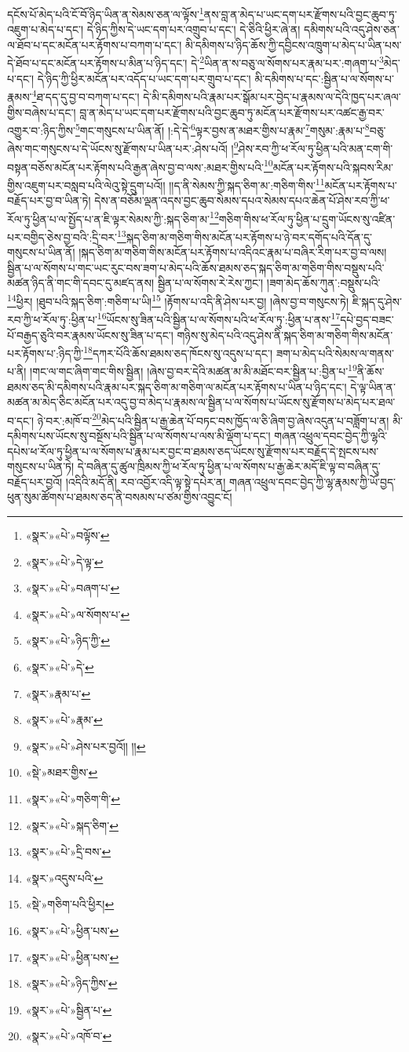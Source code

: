 དངོས་པོ་མེད་པའི་ངོ་བོ་ཉིད་ཡིན་ན་སེམས་ཅན་ལ་ལྟོས་\footnote{«སྣར་»«པེ་»བལྟོས་}ནས་བླ་ན་མེད་པ་ཡང་དག་པར་རྫོགས་པའི་བྱང་ཆུབ་ཏུ་འཇུག་པ་མེད་པ་དང་། དེ་ཉིད་ཀྱིས་དེ་ཡང་དག་པར་འགྲུབ་པ་དང་། དེ་ཅིའི་ཕྱིར་ཞེ་ན། དམིགས་པའི་འདུ་ཤེས་ཅན་ལ་ཐོབ་པ་དང་མངོན་པར་རྟོགས་པ་བཀག་པ་དང་། མི་དམིགས་པ་ཉིད་ཆོས་ཀྱི་དབྱིངས་འཁྲུག་པ་མེད་པ་ཡིན་པས་དེ་ཐོབ་པ་དང་མངོན་པར་རྟོགས་པ་མིན་པ་ཉིད་དང་། དེ་\footnote{«སྣར་»«པེ་»དེ་ལྟ་}ཡིན་ན་ས་བཅུ་ལ་སོགས་པར་རྣམ་པར་:གཞག་པ་\footnote{«སྣར་»«པེ་»བཞག་པ་}མེད་པ་དང་། དེ་ཉིད་ཀྱི་ཕྱིར་མངོན་པར་འདོད་པ་ཡང་དག་པར་གྲུབ་པ་དང་། མི་དམིགས་པ་དང་:སྦྱིན་པ་ལ་སོགས་པ་རྣམས་\footnote{«སྣར་»«པེ་»ལ་སོགས་པ་}ཐ་དད་དུ་བྱ་བ་བཀག་པ་དང་། དེ་མི་དམིགས་པའི་རྣམ་པར་སྒོམ་པར་བྱེད་པ་རྣམས་ལ་དེའི་ཁྱད་པར་ཞལ་གྱིས་བཞེས་པ་དང་། བླ་ན་མེད་པ་ཡང་དག་པར་རྫོགས་པའི་བྱང་ཆུབ་ཏུ་མངོན་པར་རྫོགས་པར་འཚང་རྒྱ་བར་འགྱུར་བ་:ཉིད་ཀྱིས་\footnote{«སྣར་»«པེ་»ཉིད་ཀྱི་}གང་གསུངས་པ་ཡིན་ནོ། །:དེ་དེ་\footnote{«སྣར་»«པེ་»དེ་}ལྟར་བྱས་ན་མཐར་གྱིས་པ་རྣམ་\footnote{«སྣར་»རྣམ་པ་}གསུམ་:རྣམ་པ་\footnote{«སྣར་»«པེ་»རྣམ་}བཅུ་ཞེས་གང་གསུངས་པ་དེ་ཡོངས་སུ་རྫོགས་པ་ཡིན་པར་:ཤེས་པའོ། །\footnote{«སྣར་»«པེ་»ཤེས་པར་བྱའོ།། །།}ཤེས་རབ་ཀྱི་ཕ་རོལ་ཏུ་ཕྱིན་པའི་མན་ངག་གི་བསྟན་བཅོས་མངོན་པར་རྟོགས་པའི་རྒྱན་ཞེས་བྱ་བ་ལས་:མཐར་གྱིས་པའི་\footnote{«སྡེ་»མཐར་གྱིས་}མངོན་པར་རྟོགས་པའི་སྐབས་རིམ་གྱིས་འཇུག་པར་བསླབ་པའི་ལེའུ་སྟེ་དྲུག་པའོ།། །།ད་ནི་སེམས་ཀྱི་སྐད་ཅིག་མ་:གཅིག་གིས་\footnote{«སྣར་»«པེ་»གཅིག་གི་}མངོན་པར་རྟོགས་པ་བརྗོད་པར་བྱ་བ་ཡིན་ཏེ། དེས་ན་བཅོམ་ལྡན་འདས་བྱང་ཆུབ་སེམས་དཔའ་སེམས་དཔའ་ཆེན་པོ་ཤེས་རབ་ཀྱི་ཕ་རོལ་ཏུ་ཕྱིན་པ་ལ་སྤྱོད་པ་ན་ཇི་ལྟར་སེམས་ཀྱི་:སྐད་ཅིག་མ་\footnote{«སྣར་»«པེ་»སྐད་ཅིག་}གཅིག་གིས་ཕ་རོལ་ཏུ་ཕྱིན་པ་དྲུག་ཡོངས་སུ་འཛིན་པར་བགྱིད་ཅེས་བྱ་བའི་:དྲི་བར་\footnote{«སྣར་»«པེ་»དྲི་བས་}སྐད་ཅིག་མ་གཅིག་གིས་མངོན་པར་རྟོགས་པ་ཉེ་བར་དགོད་པའི་དོན་དུ་གསུངས་པ་ཡིན་ནོ། །སྐད་ཅིག་མ་གཅིག་གིས་མངོན་པར་རྟོགས་པ་འདིའང་རྣམ་པ་བཞིར་རིག་པར་བྱ་བ་ལས། སྦྱིན་པ་ལ་སོགས་པ་གང་ཡང་རུང་བས་ཟག་པ་མེད་པའི་ཆོས་ཐམས་ཅད་སྐད་ཅིག་མ་གཅིག་གིས་བསྡུས་པའི་མཚན་ཉིད་ནི་གང་གི་དབང་དུ་མཛད་ནས། སྦྱིན་པ་ལ་སོགས་རེ་རེས་ཀྱང་། །ཟག་མེད་ཆོས་ཀུན་:བསྡུས་པའི་\footnote{«སྣར་»འདུས་པའི་}ཕྱིར། །ཐུབ་པའི་སྐད་ཅིག་:གཅིག་པ་ཡི།\footnote{«སྡེ་»གཅིག་པའི་ཕྱིར།} །རྟོགས་པ་འདི་ནི་ཤེས་པར་བྱ། །ཞེས་བྱ་བ་གསུངས་ཏེ། ཇི་སྐད་དུ་ཤེས་རབ་ཀྱི་ཕ་རོལ་ཏུ་:ཕྱིན་པ་\footnote{«སྣར་»«པེ་»ཕྱིན་པས་}ཡོངས་སུ་ཟིན་པའི་སྦྱིན་པ་ལ་སོགས་པའི་ཕ་རོལ་ཏུ་:ཕྱིན་པ་ནས་\footnote{«སྣར་»«པེ་»ཕྱིན་པས་}དཔེ་བྱད་བཟང་པོ་བརྒྱད་ཅུའི་བར་རྣམས་ཡོངས་སུ་ཟིན་པ་དང་། གཉིས་སུ་མེད་པའི་འདུ་ཤེས་ནི་སྐད་ཅིག་མ་གཅིག་གིས་མངོན་པར་རྟོགས་པ་:ཉིད་ཀྱི་\footnote{«སྣར་»«པེ་»ཉིད་ཀྱིས་}དཀར་པོའི་ཆོས་ཐམས་ཅད་ཁོངས་སུ་འདུས་པ་དང་། ཟག་པ་མེད་པའི་སེམས་ལ་གནས་པ་ནི། །གང་ལ་གང་ཞིག་གང་གིས་སྦྱིན། །ཞེས་བྱ་བར་དེའི་མཚན་མ་མི་མཐོང་བར་སྦྱིན་པ་:བྱིན་པ་\footnote{«སྣར་»«པེ་»སྦྱིན་པ་}ནི་ཆོས་ཐམས་ཅད་མི་དམིགས་པའི་རྣམ་པར་སྐད་ཅིག་མ་གཅིག་ལ་མངོན་པར་རྟོགས་པ་ཡིན་པ་ཉིད་དང་། དེ་ལྟ་ཡིན་ན་མཚན་མ་མེད་ཅིང་མངོན་པར་འདུ་བྱ་བ་མེད་པ་རྣམས་ལ་སྦྱིན་པ་ལ་སོགས་པ་ཡོངས་སུ་རྫོགས་པ་མེད་པར་ཐལ་བ་དང་། ཉེ་བར་:མཁོ་བ་\footnote{«སྣར་»«པེ་»འཁོ་བ་}མེད་པའི་སྦྱིན་པ་རྒྱ་ཆེན་པོ་བཏང་བས་ཁྱོད་ལ་ཅི་ཞིག་བྱ་ཞེས་འདུན་པ་བཟློག་པ་ན། མི་དམིགས་པས་ཡོངས་སུ་བསྔོས་པའི་སྦྱིན་པ་ལ་སོགས་པ་ལས་མི་ལྡོག་པ་དང་། གཞན་འཕྲུལ་དབང་བྱེད་ཀྱི་ལྷའི་དཔེས་ཕ་རོལ་ཏུ་ཕྱིན་པ་ལ་སོགས་པ་རྣམ་པར་བྱང་བ་ཐམས་ཅད་ཡོངས་སུ་རྫོགས་པར་བརྗོད་དེ་སྤངས་པས་གསུངས་པ་ཡིན་ཏེ། དེ་བཞིན་དུ་ཚུལ་ཁྲིམས་ཀྱི་ཕ་རོལ་ཏུ་ཕྱིན་པ་ལ་སོགས་པ་རྒྱ་ཆེར་མདོ་ཇི་ལྟ་བ་བཞིན་དུ་བརྗོད་པར་བྱའོ། །འདིའི་མདོ་ནི། རབ་འབྱོར་འདི་ལྟ་སྟེ་དཔེར་ན། གཞན་འཕྲུལ་དབང་བྱེད་ཀྱི་ལྷ་རྣམས་ཀྱི་ཡོ་བྱད་ཕུན་སུམ་ཚོགས་པ་ཐམས་ཅད་ནི་བསམས་པ་ཙམ་གྱིས་འབྱུང་ངོ། 